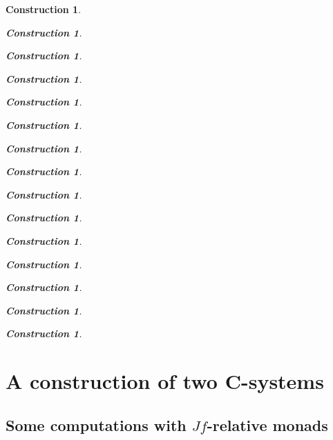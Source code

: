\documentclass[12pt]{amsart}
\newtheorem{lemma}[proposition]{Lemma}
\numberwithin{proposition}{subsection}
\newtheorem{construction}[proposition]{Construction}
\newcommand{\llabel}[1]{\label{#1}}
\newcommand{\sr}{\rightarrow}
\begin{document}
\begin{construction}
\begin{construction}
\begin{construction}
\begin{construction}
\begin{construction}
\begin{construction}
\begin{construction}
\begin{construction}
\begin{construction}
\begin{construction}
\begin{construction}
\begin{construction}
\begin{construction}
\begin{construction}
\begin{construction}




\section{A construction of two C-systems}

\subsection{Some computations with $Jf$-relative monads}
%
\llabel{Jfrel}
%


\end{construction}
\end{construction}
\end{construction}
\end{construction}
\end{construction}
\end{construction}
\end{construction}
\end{construction}
\end{construction}
\end{construction}
\end{construction}
\end{construction}
\end{construction}
\end{construction}
\end{construction}
\end{document}
